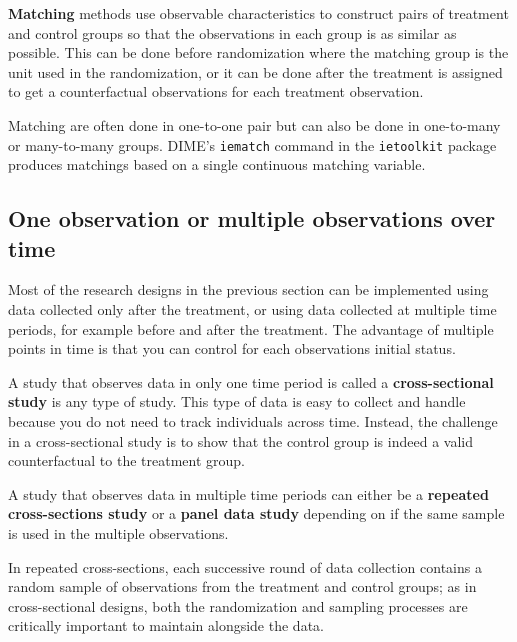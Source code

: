 
\textbf{Matching}
 methods use observable characteristics to construct pairs of treatment and control groups so that the observations in each group is as similar as possible. 
This can be done before randomization where the matching group is the unit used in the randomization,
or it can be done after the treatment is assigned to get a counterfactual observations for each treatment observation.

Matching are often done in one-to-one pair but can also be done in one-to-many or many-to-many groups. DIME's \texttt{iematch} command in the \texttt{ietoolkit} package produces matchings based on a single continuous matching variable.




\subsection{One observation or multiple observations over time}

Most of the research designs in the previous section can be implemented 
using data collected only after the treatment, 
or using data collected at multiple time periods, 
for example before and after the treatment. 
The advantage of multiple points in time is 
that you can control for each observations initial status.

A study that observes data in only one time period is called 
a \textbf{cross-sectional study} is any type of study. 
This type of data is easy to collect and handle because
you do not need to track individuals across time. 
Instead, the challenge in a cross-sectional study is to
show that the control group is indeed a valid counterfactual to the treatment group.

A study that observes data in multiple time periods can either be a 
\textbf{repeated cross-sections study} or a \textbf{panel data study} 
depending on if the same sample is used in the multiple observations.

In repeated cross-sections, each successive round of data collection contains a random sample
of observations from the treatment and control groups;
as in cross-sectional designs, both the randomization and sampling processes
are critically important to maintain alongside the data.


